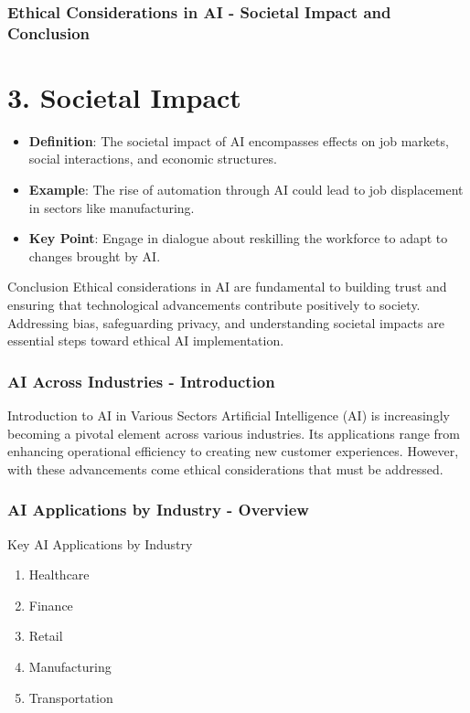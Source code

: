 \documentclass[aspectratio=169]{beamer}
\begin{document}
\begin{frame}[fragile]
    \frametitle{Ethical Considerations in AI - Societal Impact and Conclusion}
    \section*{3. Societal Impact}
    \begin{itemize}
        \item \textbf{Definition}: The societal impact of AI encompasses effects on job markets, social interactions, and economic structures.
        \item \textbf{Example}: The rise of automation through AI could lead to job displacement in sectors like manufacturing.
        \item \textbf{Key Point}: Engage in dialogue about reskilling the workforce to adapt to changes brought by AI.
    \end{itemize}

    \begin{block}{Conclusion}
        Ethical considerations in AI are fundamental to building trust and ensuring that technological advancements contribute positively to society. 
        Addressing bias, safeguarding privacy, and understanding societal impacts are essential steps toward ethical AI implementation.
    \end{block}
\end{frame}

\begin{frame}[fragile]
    \frametitle{AI Across Industries - Introduction}
    \begin{block}{Introduction to AI in Various Sectors}
        Artificial Intelligence (AI) is increasingly becoming a pivotal element across various industries. Its applications range from enhancing operational efficiency to creating new customer experiences. However, with these advancements come ethical considerations that must be addressed.
    \end{block}
\end{frame}

\begin{frame}[fragile]
    \frametitle{AI Applications by Industry - Overview}
    \begin{block}{Key AI Applications by Industry}
        \begin{enumerate}
            \item Healthcare
            \item Finance
            \item Retail
            \item Manufacturing
            \item Transportation
        \end{enumerate}
    \end{block}
\end{frame}
\end{document}
